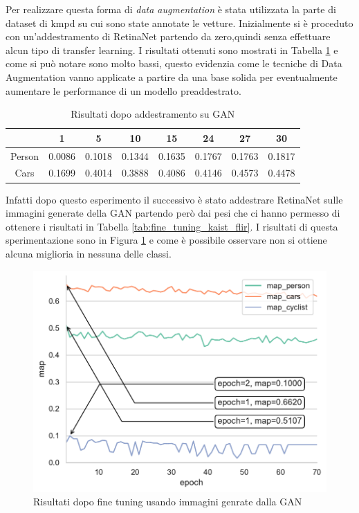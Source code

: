 Per realizzare questa forma di \textit{data augmentation} è stata utilizzata la parte di dataset di \ac{kmpd} su cui sono state annotate le vetture. Inizialmente si è proceduto con un'addestramento di RetinaNet partendo da zero,quindi senza effettuare alcun tipo di transfer learning. 
I risultati ottenuti sono mostrati in Tabella \ref{tab:result_GAN_scratch} e come si può notare sono molto bassi, questo evidenzia come le tecniche di Data Augmentation vanno applicate a partire da una base solida per eventualmente aumentare le performance di un modello preaddestrato. 
\begin{table}[]
    \begin{tabular}{c|c|c|c|c|c|c|c|}
    \cline{2-8}
     & 1 & 5 & 10 & 15 & \textbf{24} & \textbf{27} & 30 \\ \hline
    \multicolumn{1}{|c|}{Person} & 0.0086 & 0.1018 & 0.1344 & 0.1635 & 0.1767 & 0.1763 & 0.1817 \\ \hline
    \multicolumn{1}{|c|}{Cars} & 0.1699 & 0.4014 & 0.3888 & 0.4086 & 0.4146 & 0.4573 & 0.4478 \\ \hline
    \end{tabular}
    \caption{Risultati dopo addestramento su GAN}
    \label{tab:result_GAN_scratch}
\end{table}
Infatti dopo questo esperimento il successivo è stato addestrare RetinaNet sulle immagini generate della \ac{GAN} partendo però dai pesi che ci hanno permesso di ottenere i risultati in Tabella \ref{tab:fine_tuning_kaist_flir}. I risultati di questa sperimentazione sono in Figura \ref{fig:fine_tuning_gan} e come è possibile osservare non si ottiene alcuna miglioria in nessuna delle classi. 
\begin{figure}[]
    \centering
    \includegraphics[width=\textwidth]{images/graphic/graphics_GAN.pdf}
    \caption{Risultati dopo fine tuning usando immagini genrate dalla GAN}
    \label{fig:fine_tuning_gan}
\end{figure}

